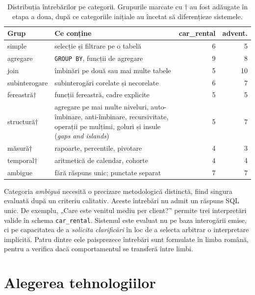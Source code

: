\documentclass[12pt,a4paper]{report}
\newcommand{\hd}[1]{\textbf{#1}}
\newcommand{\code}[1]{\texttt{\small #1}}
\begin{document}
\begin{table}[H]
\centering
\caption{Distribuția întrebărilor pe categorii. Grupurile marcate cu
$\dagger$ au fost adăugate în etapa a doua, după ce categoriile inițiale au
încetat să diferențieze sistemele.}
\label{tab:categorii}
\footnotesize
\begin{tabularx}{\textwidth}{@{}p{2.6cm} L R R@{}}
\toprule
\hd{Grup} & \hd{Ce conține} & \hd{car\_rental} & \hd{advent.} \\
\midrule
simple & selecție și filtrare pe o tabelă & 6 & 5 \\
agregare & \code{GROUP BY}, funcții de agregare & 9 & 8 \\
join & îmbinări pe două sau mai multe tabele & 5 & 10 \\
subinterogare & subinterogări corelate și necorelate & 6 & 7 \\
fereastră$\dagger$ & funcții fereastră, cadre explicite & 5 & 5 \\
structură$\dagger$ & agregare pe mai multe niveluri, auto-îmbinare,
anti-îmbinare, recursivitate, operații pe mulțimi, goluri și insule (\emph{gaps and islands}) & 5 & 7 \\
măsură$\dagger$ & rapoarte, percentile, pivotare & 4 & 3 \\
temporal$\dagger$ & aritmetică de calendar, cohorte & 4 & 4 \\
\midrule
ambigue & fără răspuns unic; punctate separat & 7 & 7 \\
\bottomrule
\end{tabularx}
\end{table}

Categoria \emph{ambiguă} necesită o precizare metodologică distinctă, fiind singura evaluată
după un criteriu calitativ. Aceste întrebări nu admit un răspuns SQL unic. De exemplu,
„Care este venitul mediu per client?” permite trei interpretări valide în schema \code{car\_rental}.
Sistemul este evaluat nu pe baza interogării emise, ci pe capacitatea de a \emph{solicita clarificări}
în loc de a selecta arbitrar o interpretare implicită. Patru dintre cele paisprezece
întrebări sunt formulate în limba română, pentru a verifica dacă
comportamentul se transferă între limbi.

\section{Alegerea tehnologiilor}
\end{document}
